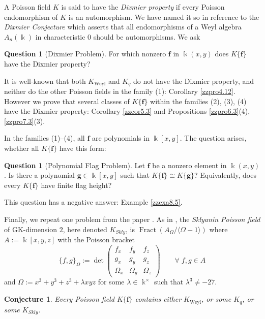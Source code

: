 \documentclass[12pt]{amsart}
\theoremstyle{plain}
\newtheorem{conjecture}[theorem]{Conjecture}
\numberwithin{theorem}{section}
\numberwithin{equation}{theorem}
\theoremstyle{definition}
\newtheorem{question}[theorem]{Question}
\DeclareMathOperator \Fract { {\mathrm{Fract}} }
\newcommand \bff {{\mathbf{f}}}
\newcommand \bfg {{\mathbf{g}}}
\DeclareMathOperator{\Weyl}{Weyl}
\newcommand \Kweyl {K_{\Weyl}}
\newcommand \kx {\Bbbk^\times}
\begin{document}
A Poisson field $K$ is said to have 
the \emph{Dixmier property} if 
every Poisson endomorphism of $K$ 
is an automorphism.  We have named 
it so in reference to the 
\emph{Dixmier Conjecture} which 
asserts that all endomorphisms of 
a Weyl algebra $A_n(\Bbbk)$ in 
characteristic $0$ should be 
automorphisms.  We ask

\begin{question}[Dixmier Problem]
\label{zzque0.9}
For which nonzero $\bff$ in $\Bbbk(x,y)$ 
does $K\{\bff\}$ have the Dixmier 
property?
\end{question}

It is well-known that both $\Kweyl$ 
and $K_q$ do not have the Dixmier 
property, and neither do the other 
Poisson fields in the family (1): 
Corollary \ref{zzpro4.12}. However we 
prove that several classes of $K\{\bff\}$ 
within the families (2), (3), (4) have 
the Dixmier property: Corollary 
\ref{zzcor5.3} and Propositions 
\ref{zzpro6.3}(4), \ref{zzpro7.3}(3).

In the families (1)--(4), all $\bff$ 
are polynomials in $\Bbbk[x,y]$.
The question arises, whether all 
$K\{\bff\}$ have this form:


\begin{question}[Polynomial Flag Problem]
\label{zzque0.10}
Let $\bff$ be a nonzero element in 
$\Bbbk(x,y)$. Is there a polynomial 
$\bfg\in \Bbbk[x,y]$ such that
$K\{\bff\}\cong K\{\bfg\}$? 
Equivalently, does every $K\{\bff\}$
have finite flag height?
\end{question}

This question has a negative answer: 
Example \ref{zzexa8.5}.

Finally, we repeat one problem from 
the paper \cite{GZ2}.  As in 
\cite{HTWZ1}, the \emph{Sklyanin 
Poisson field} of GK-dimension $2$, 
here denoted $K_{Skly}$, is 
$\Fract(A_{\Omega}/ \langle 
\Omega-1 \rangle)$ where $A := 
\Bbbk[x,y,z]$ with the Poisson bracket
$$
\{f,g\}_\Omega := \det \begin{pmatrix}
f_x&f_y&f_z\\ g_x&g_y&g_z\\ \Omega_x&\Omega_y&\Omega_z \end{pmatrix} \qquad \forall\; f,g \in A
$$
and $\Omega := x^3+y^3+z^3+ \lambda xyz$ 
for some $\lambda\in\kx$ such that 
$\lambda^3 \ne - 27$. 

\begin{conjecture}
\label{zzcon0.11}
Every Poisson field $K\{\bff\}$ contains 
either $\Kweyl$, or some $K_{q}$, or 
some $K_{Skly}$.
\end{conjecture}
\end{document}
